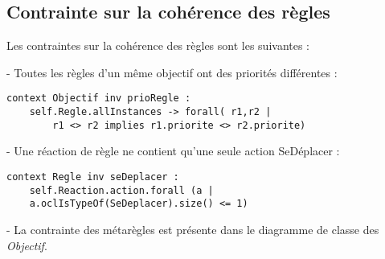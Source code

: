 
\subsection{Contrainte sur la cohérence des règles}
\label{sec:question20}

Les contraintes sur la cohérence des règles sont les suivantes :

- Toutes les règles d'un même objectif ont des priorités différentes :

\begin{lstlisting}[caption=Contrainte sur les priorités,captionpos=b,label={lst:règles},language=OCL]
context Objectif inv prioRegle :
    self.Regle.allInstances -> forall( r1,r2 |
        r1 <> r2 implies r1.priorite <> r2.priorite)
\end{lstlisting}

- Une réaction de règle ne contient qu'une seule action SeDéplacer :

\begin{lstlisting}[caption=Contrainte sur SeDéplacer,captionpos=b,label={lst:SeDéplacer},language=OCL]
context Regle inv seDeplacer :
    self.Reaction.action.forall (a | 
    a.oclIsTypeOf(SeDeplacer).size() <= 1)
\end{lstlisting}

- La contrainte des métarègles est présente dans le diagramme de classe des \emph{Objectif}.